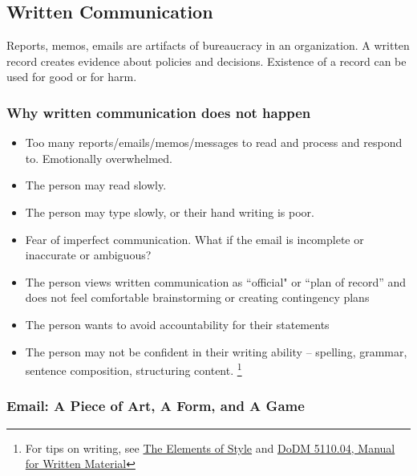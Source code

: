 \subsection{Written Communication\label{sec:written-communication}}

Reports, memos, emails are artifacts of bureaucracy in an organization. A written record creates evidence about policies and decisions. Existence of a record can be used for good or for harm.







\subsubsection{Why written communication does not happen\label{sec:written-comm-does-not-happen}}
\begin{itemize}
    \item Too many reports/emails/memos/messages to read and process and respond to. Emotionally overwhelmed.
\item The person may read slowly.
\item The person may type slowly, or their hand writing is poor.
\item Fear of imperfect communication. What if the email is incomplete or inaccurate or ambiguous?
\item The person views written communication as ``official" or ``plan of record'' and does not feel comfortable brainstorming or creating contingency plans
\item The person wants to avoid accountability for their statements
\item The person may not be confident in their writing ability -- spelling, grammar, sentence composition, structuring content. \footnote{For tips on writing, see 
\href{https://en.wikipedia.org/wiki/The_Elements_of_Style}{The Elements of Style}
and
\href{https://www.google.com/search?q=dodm+5110.04}{DoDM 5110.04, Manual for Written Material}}
\end{itemize}




\subsubsection{Email: A Piece of Art, A Form, and A Game\label{sec:art-form-game}}

